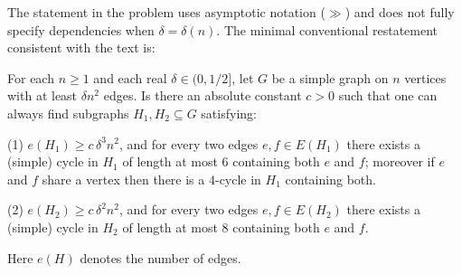 The statement in the problem uses asymptotic notation ($\gg$) and does not fully specify dependencies when $\delta=\delta(n)$.
The minimal conventional restatement consistent with the text is:

For each $n\ge 1$ and each real $\delta\in(0,1/2]$, let $G$ be a simple graph on $n$ vertices with at least $\delta n^2$ edges.
Is there an absolute constant $c>0$ such that one can always find subgraphs $H_1,H_2\subseteq G$ satisfying:

(1) $e(H_1)\ge c\,\delta^3 n^2$, and for every two edges $e,f\in E(H_1)$ there exists a (simple) cycle in $H_1$ of length at most $6$ containing both $e$ and $f$; moreover if $e$ and $f$ share a vertex then there is a $4$-cycle in $H_1$ containing both.

(2) $e(H_2)\ge c\,\delta^2 n^2$, and for every two edges $e,f\in E(H_2)$ there exists a (simple) cycle in $H_2$ of length at most $8$ containing both $e$ and $f$.

Here $e(H)$ denotes the number of edges.
